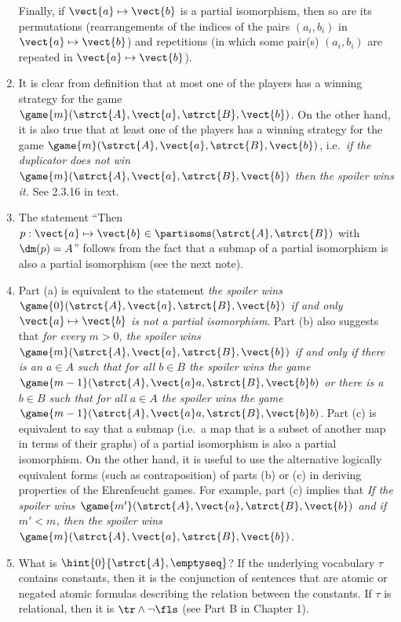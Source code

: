 \begin{enumerate}[1.]
Finally, if $\vect{a} \mapsto \vect{b}$ is a partial isomorphism, then so are its permutations (rearrangements of the indices of the pairs $(a_i, b_i)$ in $\vect{a} \mapsto \vect{b}$) and repetitions (in which some pair(s) $(a_i, b_i)$ are repeated in $\vect{a} \mapsto \vect{b}$).
%
\item {} It is clear from definition that at most one of the players has a winning strategy for the game $\game{m}(\strct{A}, \vect{a}, \strct{B}, \vect{b})$.
\newpar
On the other hand, it is also true that at least one of the players has a winning strategy for the game $\game{m}(\strct{A}, \vect{a}, \strct{B}, \vect{b})$, i.e.\ \emph{if the duplicator does not win $\game{m}(\strct{A}, \vect{a}, \strct{B}, \vect{b})$ then the spoiler wins it.} See 2.3.16 in text.
%
\item {} The statement ``Then $p : \vect{a} \mapsto \vect{b} \in \partisoms(\strct{A}, \strct{B})$ with $\dm(p) = A$'' follows from the fact that a submap of a partial isomorphism is also a partial isomorphism (see the next note).
%
\item {} Part (a) is equivalent to the statement \emph{the spoiler wins $\game{0}(\strct{A}, \vect{a}, \strct{B}, \vect{b})$ if and only $\vect{a} \mapsto \vect{b}$ is not a partial isomorphism}.
\newpar
Part (b) also suggests that \emph{for every $m > 0$, the spoiler wins $\game{m}(\strct{A}, \vect{a}, \strct{B}, \vect{b})$ if and only if there is an $a \in A$ such that for all $b \in B$ the spoiler wins the game $\game{m - 1}(\strct{A}, \vect{a}a, \strct{B}, \vect{b}b)$ or there is a $b \in B$ such that for all $a \in A$ the spoiler wins the game $\game{m - 1}(\strct{A}, \vect{a}a, \strct{B}, \vect{b}b)$}.
\newpar
Part (c) is equivalent to say that a submap (i.e.\ a map that is a subset of another map in terms of their graphs) of a partial isomorphism is also a partial isomorphism.
\newpar
On the other hand, it is useful to use the alternative logically equivalent forms (such as contraposition) of parts (b) or (c) in deriving properties of the Ehrenfeucht games. For example, part (c) implies that
\newpar
\emph{If the spoiler wins $\game{m'}(\strct{A}, \vect{a}, \strct{B}, \vect{b})$ and if $m' < m$, then the spoiler wins $\game{m}(\strct{A}, \vect{a}, \strct{B}, \vect{b})$.}
%
\item {} What is $\hint{0}{\strct{A}, \emptyseq}$? If the underlying vocabulary $\tau$ contains constants, then it is the conjunction of sentences that are atomic or negated atomic formulas describing the relation between the constants. If $\tau$ is relational, then it is $\tr \land \neg\fls$ (see Part B in Chapter 1).

\end{enumerate}
